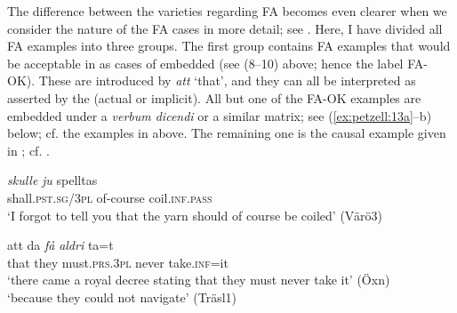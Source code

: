 \documentclass[output=paper,colorlinks,citecolor=brown,draft,draftmode]{langscibook}
\begin{document}
The difference between the varieties regarding FA becomes even clearer when we consider the nature of the FA cases in more detail; see . Here, I have divided all FA examples into three groups. The first group contains FA examples that would be acceptable in  as cases of embedded  (see (8–10) above; hence the label FA-OK). These are introduced by \textit{att} ‘that’, and they can all be interpreted as asserted by the  (actual or implicit). All but one of the FA-OK examples are embedded under a \textit{verbum dicendi} or a similar matrix; see (\ref{ex:petzell:13a}–b) below; cf. the examples in  above. The remaining one is the causal example given in ; cf. .


\ea\label{ex:petzell:13}

\gll    \textit{{skulle}} \textit{{ju}}        spelltas    \\
    shall.\textsc{pst.sg}/3\textsc{pl}  of-course  coil.\textsc{inf}.\textsc{pass}\\
\glt `I forgot to tell you that the yarn should of course be coiled' (Värö3)  \\


\gll    att      da \textit{{få}} \textit{{aldri}} ta=t        \\
    that    they    must.\textsc{prs}.3\textsc{pl}  never    take.\textsc{inf}=it    \\
\glt `there came a royal decree stating that they must never take it’ (Öxn)    \\

\glt `because they could not navigate’ (Träsl1)
\z
\z
\end{document}

